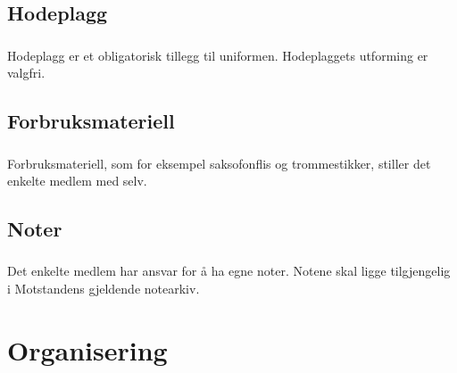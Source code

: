 \documentclass{article}
\newenvironment{statute}[1][]
    {
        \titleformat{\subsubsection}[runin]{\normalfont}{\hspace{1pt}\textit{\S\hspace{5pt}\thesubsubsection}}{0pt}{\rule{4pt}{0pt}}{}
        \subsubsection{}#1
        \begin{minipage}[t]{0.9\linewidth}
    }
    {
        \end{minipage}
        
        \ignorespacesafterend
    }
\begin{document}
        \subsection{Hodeplagg}
            \begin{statute}
                Hodeplagg er et obligatorisk tillegg til uniformen. Hodeplaggets utforming er valgfri.
            \end{statute}
            
        \subsection{Forbruksmateriell}
            \begin{statute}
                Forbruksmateriell, som for eksempel saksofonflis og trommestikker, stiller det enkelte medlem med selv.
            \end{statute}
            
        \subsection{Noter}
            \begin{statute}
                Det enkelte medlem har ansvar for å ha egne noter. Notene skal ligge tilgjengelig i Motstandens gjeldende notearkiv.
            \end{statute}
            
    \section{Organisering}
\end{document}
